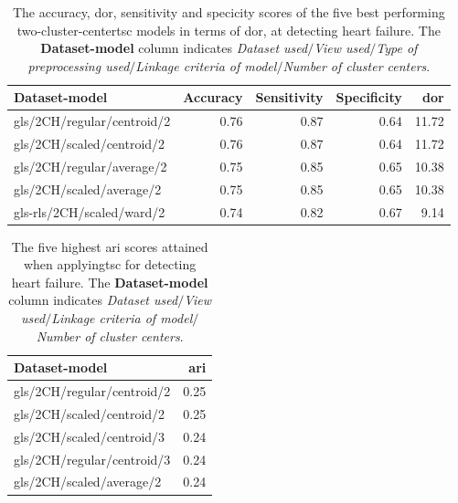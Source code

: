 \begin{table}
    \centering
    \begin{tabular}{lrrrr}
        \toprule
        Dataset-model             &  Accuracy &  Sensitivity &  Specificity & \acrshort{dor} \\
        \midrule
        \acrshort{gls}/2CH/regular/centroid/2 &      0.76 &         0.87 &         0.64 & 11.72 \\
        \acrshort{gls}/2CH/scaled/centroid/2  &      0.76 &         0.87 &         0.64 & 11.72 \\
        \acrshort{gls}/2CH/regular/average/2  &      0.75 &         0.85 &         0.65 & 10.38 \\
        \acrshort{gls}/2CH/scaled/average/2   &      0.75 &         0.85 &         0.65 & 10.38 \\
        \acrshort{gls}-rls/2CH/scaled/ward/2  &      0.74 &         0.82 &         0.67 &  9.14 \\
        \bottomrule
    \end{tabular}
    \caption{The accuracy, \acrshort{dor}, sensitivity and specicity scores of the five best performing two-cluster-center\acrshort{tsc} models in terms of \acrshort{dor}, at detecting heart failure.
             The \textbf{Dataset-model} column indicates \textit{Dataset used}$/$\textit{View used}$/$\textit{Type of preprocessing used}$/$\textit{Linkage criteria of model}$/$\textit{Number of cluster centers}.}
    \label{tab:tsc_hf_dor_sens_spec_dist}
\end{table}

\begin{table}[htb]
    \centering
    \begin{tabular}{lr}
        \toprule
        Dataset-model             &  \acrshort{ari} \\
        \midrule
        \acrshort{gls}/2CH/regular/centroid/2 & 0.25 \\
        \acrshort{gls}/2CH/scaled/centroid/2  & 0.25 \\
        \acrshort{gls}/2CH/scaled/centroid/3  & 0.24 \\
        \acrshort{gls}/2CH/regular/centroid/3 & 0.24 \\
        \acrshort{gls}/2CH/scaled/average/2   & 0.24 \\
        \bottomrule
    \end{tabular}
    \caption{The five highest \acrshort{ari} scores attained when applying\acrshort{tsc} for detecting heart failure.
             The \textbf{Dataset-model} column indicates \textit{Dataset used}$/$\textit{View used}$/$\textit{Linkage criteria of model}$/$\textit{Number of cluster centers}.}
    \label{tab:tsc_hf_ari}
\end{table}

